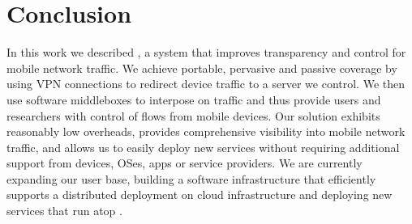 \vspace{1em}
\section{Conclusion}
\label{sec:conclusion}
In this work we described \meddle, a system that improves transparency and 
control for mobile network traffic. We achieve portable, pervasive and passive 
coverage by using VPN connections to redirect device traffic  
to a server we control. We then use software middleboxes to interpose on 
traffic and thus provide users and researchers with control of flows from mobile devices. 
Our solution exhibits reasonably low overheads, provides comprehensive 
visibility into mobile network traffic, and allows us to easily deploy new 
services without requiring additional support from devices, OSes, apps or 
service providers. We are currently expanding our user base, building a 
software infrastructure that efficiently supports a distributed deployment on cloud 
infrastructure and deploying new services that run atop \meddle.